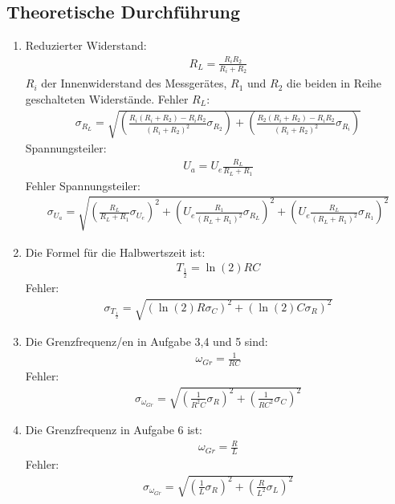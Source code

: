 \documentclass[12pt]{scrartcl}
\begin{document}
\subsection{Theoretische Durchführung}
\begin{enumerate}
\item
Reduzierter Widerstand:
\begin{align}
R_L = \frac{R_i R_2}{R_i + R_2}
\end{align}
$R_i$ der Innenwiderstand des Messgerätes,
$R_1$ und $R_2$ die beiden in Reihe geschalteten Widerstände.
Fehler $R_L$:
\begin{align}
\sigma_{R_L} = \sqrt{
\left(\frac{R_i(R_i+R_2)-R_i R_2}{(R_i + R_2)^2}\sigma_{R_2}\right)+
\left(\frac{R_2(R_i+R_2)-R_i R_2}{(R_i + R_2)^2}\sigma_{R_i}\right)}
\end{align}
Spannungsteiler:
\begin{align}
U_a = U_e \frac{R_L}{R_L + R_1}
\end{align}
Fehler Spannungsteiler:
\begin{align}
\sigma_{U_a} = \sqrt{
\left(\frac{R_L}{R_L + R_1}\sigma_{U_e}\right)^2+
\left(U_e \frac{R_1}{(R_L + R_1)^2}\sigma_{R_L}\right)^2+
\left(U_e \frac{R_L}{(R_L + R_1)^2}\sigma_{R_1}\right)^2}
\end{align}
\item
Die Formel für die Halbwertszeit ist:
\begin{align}
T_{\frac{1}{2}} = \ln(2)RC
\end{align}
Fehler:
\begin{align}
\sigma_{T_{\frac{1}{2}}} = \sqrt{
\left(\ln(2)R\sigma_{C}\right)^2+
\left(\ln(2)C\sigma_{R}\right)^2}
\end{align}
\item
Die Grenzfrequenz/en in Aufgabe 3,4 und 5 sind:
\begin{align}
\omega_{Gr} = \frac{1}{RC}
\end{align}
Fehler:
\begin{align}
\sigma_{\omega_{Gr}} = \sqrt{
\left(\frac{1}{R^2C}\sigma_R\right)^2+
\left(\frac{1}{RC^2}\sigma_C\right)^2}
\end{align}
\item
Die Grenzfrequenz in Aufgabe 6 ist:
\begin{align}
\omega_{Gr} = \frac{R}{L}
\end{align}
Fehler:
\begin{align}
\sigma_{\omega_{Gr}} = \sqrt{\left(\frac{1}{L}\sigma_R\right)^2+\left(\frac{R}{L^2}\sigma_L\right)^2}
\end{align}

\end{enumerate}
\end{document}
